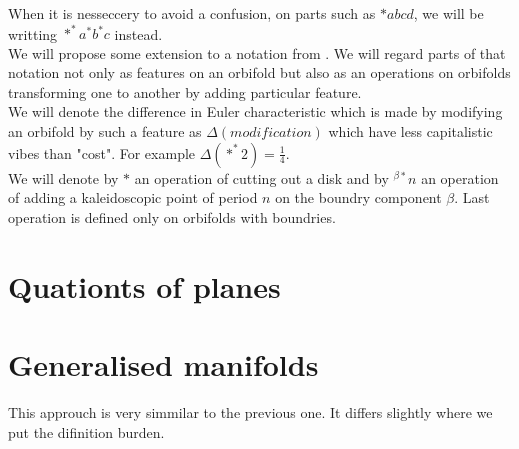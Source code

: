 When it is nesseccery to avoid a confusion, on parts such as $*abcd$, we will be writting 
$*^*a^*b^*c$ instead. \\
We will propose some extension to a notation from \cite{Conway2008}.
We will regard parts of that notation not only as features on an orbifold but also as an operations 
on orbifolds transforming one to another by adding particular feature. \\
We will denote the difference in Euler characteristic which is made by modifying 
an orbifold by such a feature as $\Delta(modification)$ 
which have less capitalistic vibes than "cost". 
For example $\Delta(*^*2) = \frac{1}{4}$. \\
We will denote by $*$ an operation of cutting out a disk and by $^{\beta*}n$ an operation of 
adding a kaleidoscopic point of period $n$ on the boundry component $\beta$. 
Last operation is defined only on orbifolds with boundries.


\section{Quationts of planes}

\section{Generalised manifolds}
This approuch is very simmilar to the previous one. It differs slightly where we put the 
difinition burden. 


